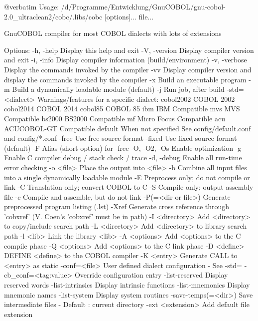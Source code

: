 @verbatim
Usage: /d/Programme/Entwicklung/GnuCOBOL/gnu-cobol-2.0_ultraclean2/cobc/.libs/cobc [options]... file...

GnuCOBOL compiler for most COBOL dialects with lots of extensions

Options:
  -h, -help             Display this help and exit
  -V, -version          Display compiler version and exit
  -i, -info             Display compiler information (build/environment)
  -v, -verbose          Display the commands invoked by the compiler
  -vv                   Display compiler version and display the commands
                        invoked by the compiler
  -x                    Build an executable program
  -m                    Build a dynamically loadable module (default)
  -j                    Run job, after build
  -std=<dialect>        Warnings/features for a specific dialect:
                          cobol2002   COBOL 2002
                          cobol2014   COBOL 2014
                          cobol85     COBOL 85
                          ibm         IBM Compatible
                          mvs         MVS Compatible
                          bs2000      BS2000 Compatible
                          mf          Micro Focus Compatible
                          acu         ACUCOBOL-GT Compatible
                          default     When not specified
                        See config/default.conf and config/*.conf
  -free                 Use free source format
  -fixed                Use fixed source format (default)
  -F                    Alias (short option) for -free
  -O, -O2, -Os          Enable optimization
  -g                    Enable C compiler debug / stack check / trace
  -d, -debug            Enable all run-time error checking
  -o <file>             Place the output into <file>
  -b                    Combine all input files into a single
                        dynamically loadable module
  -E                    Preprocess only; do not compile or link
  -C                    Translation only; convert COBOL to C
  -S                    Compile only; output assembly file
  -c                    Compile and assemble, but do not link
  -P(=<dir or file>)    Generate preprocessed program listing (.lst)
  -Xref                 Generate cross reference through 'cobxref'
                        (V. Coen's 'cobxref' must be in path)
  -I <directory>        Add <directory> to copy/include search path
  -L <directory>        Add <directory> to library search path
  -l <lib>              Link the library <lib>
  -A <options>          Add <options> to the C compile phase
  -Q <options>          Add <options> to the C link phase
  -D <define>           DEFINE <define> to the COBOL compiler
  -K <entry>            Generate CALL to <entry> as static
  -conf=<file>          User defined dialect configuration - See -std=
  -cb_conf=<tag:value>  Override configuration entry
  -list-reserved        Display reserved words
  -list-intrinsics      Display intrinsic functions
  -list-mnemonics       Display mnemonic names
  -list-system          Display system routines
  -save-temps(=<dir>)   Save intermediate files
                        - Default : current directory
  -ext <extension>      Add default file extension

